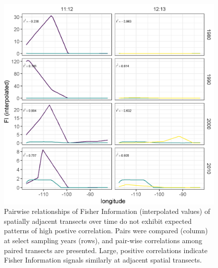 \documentclass[12pt,twoside,openany]{reedthesis}
\begin{document}
\begin{figure}[bth]

{\centering \includegraphics[width=0.85\linewidth]{./chapterFiles/fisherSpatial/figures/figsCalledInDiss/interpolated_FI_corplotSelectTransects_East-West} 

}

\caption{Pairwise relationships of Fisher Information (interpolated values) of spatially adjacent transects over time do not exhibit expected patterns of high postive correlation. Pairs were compared (column) at select sampling years (rows), and pair-wise correlations among paired transects are presented. Large, positive correlations indicate Fisher Information signals similarly at adjacent spatial transects.}\label{fig:corPlotTsectsInterp}
\end{figure}
\end{document}

